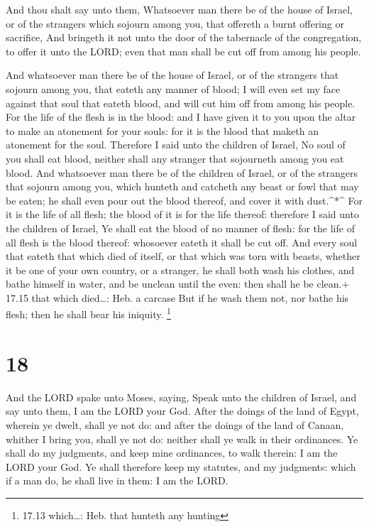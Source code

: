  And thou shalt say unto them, Whatsoever man there be of
the house of Israel, or of the strangers which sojourn among you, that
offereth a burnt offering or sacrifice,  And bringeth it not
unto the door of the tabernacle of the congregation, to offer it unto
the LORD; even that man shall be cut off from among his people.

 And whatsoever man there be of the house of Israel, or of
the strangers that sojourn among you, that eateth any manner of blood; I
will even set my face against that soul that eateth blood, and will cut
him off from among his people.  For the life of the flesh
is in the blood: and I have given it to you upon the altar to make an
atonement for your souls: for it is the blood that maketh an atonement
for the soul.  Therefore I said unto the children of
Israel, No soul of you shall eat blood, neither shall any stranger that
sojourneth among you eat blood.  And whatsoever man there
be of the children of Israel, or of the strangers that sojourn among
you, which hunteth and catcheth any beast or fowl that may be eaten; he
shall even pour out the blood thereof, and cover it with dust.\^{}*\^{}
 For it is the life of all flesh; the blood of it is for
the life thereof: therefore I said unto the children of Israel, Ye shall
eat the blood of no manner of flesh: for the life of all flesh is the
blood thereof: whosoever eateth it shall be cut off.  And
every soul that eateth that which died of itself, or that which was torn
with beasts, whether it be one of your own country, or a stranger, he
shall both wash his clothes, and bathe himself in water, and be unclean
until the even: then shall he be clean.+ 17.15 that which died\ldots:
Heb. a carcase  But if he wash them not, nor bathe his
flesh; then he shall bear his iniquity. \footnote{17.13 which\ldots:
  Heb. that hunteth any hunting}

\hypertarget{section-17}{%
\section{18}\label{section-17}}

 And the LORD spake unto Moses, saying,  Speak
unto the children of Israel, and say unto them, I am the LORD your God.
 After the doings of the land of Egypt, wherein ye dwelt,
shall ye not do: and after the doings of the land of Canaan, whither I
bring you, shall ye not do: neither shall ye walk in their ordinances.
 Ye shall do my judgments, and keep mine ordinances, to walk
therein: I am the LORD your God.  Ye shall therefore keep my
statutes, and my judgments: which if a man do, he shall live in them: I
am the LORD.

